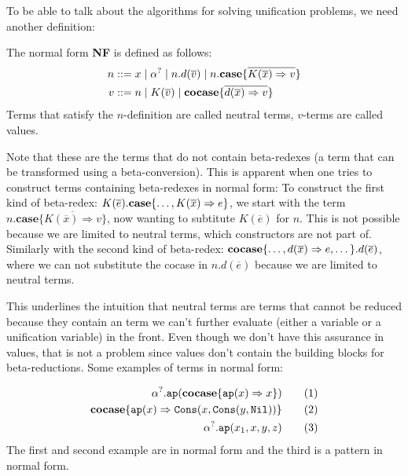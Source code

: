 \documentclass[twoside,12pt,a4paper]{article}
\begin{document}
To be able to talk about the algorithms for solving unification problems, we need another definition: %
\begin{definition}
    The normal form \textbf{NF} is defined as follows:
    \begin{align*}
        n &::= x \;|\; \alpha^? \;|\; n.d(\overline{v})\;|\; n.\textbf{case}\{\overline{K(\overline{x})\Rightarrow v}\}\\
        v &::= n \;|\; K(\overline{v}) \;|\; \textbf{cocase}\{\overline{d(\overline{x})\Rightarrow v}\}
    \end{align*}
    Terms that satisfy the $n$-definition are called neutral terms, $v$-terms are called values.
\end{definition}
Note that these are the terms that do not contain beta-redexes (a term that can be transformed using a beta-conversion).
This is apparent when one tries to construct terms containing beta-redexes in normal form: 
To construct the first kind of beta-redex: $K(\overline{e}).\textbf{case}\{\dots,K(\overline{x})\Rightarrow e\}$,
we start with the term $n.\textbf{case}\{\overline{K(\overline{x})\Rightarrow v}\}$, now wanting to subtitute $K(\overline{e})$ for $n$. 
This is not possible because we are limited to neutral terms, which constructors are not part of.
Similarly with the second kind of beta-redex:
$\textbf{cocase}\{\dots,d(\overline{x}) \Rightarrow e, \dots\}.d(\overline{e})$, where we can not substitute the cocase in $n.d(\overline{e})$ because we are limited to neutral terms.
        
This underlines the intuition that neutral terms are terms that cannot be reduced because
they contain an term we can't further evaluate (either a variable or a unification variable) in the front.
Even though we don't have this assurance in values, that is not a problem since values don't contain the building blocks for beta-reductions. 
Some examples of terms in normal form: 
\begin{example}
\begin{align*}
    \alpha^?.\texttt{ap}(\textbf{cocase}\{\texttt{ap}(x)\Rightarrow x\}) \tag{1}\\
    \textbf{cocase}\{\texttt{ap}(x)\Rightarrow \mathtt{Cons(\mathnormal{x}, Cons(\mathnormal{y}, Nil))}\} \tag{2}\\
    \alpha^?.\texttt{ap}(x_1, x, y, z) \tag{3}    
\end{align*}
The first and second example are in normal form and the third is a pattern in normal form.
\end{example}
\end{document}
